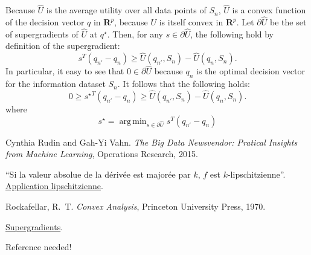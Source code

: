 \documentclass[11pt,fleqn]{article}
\DeclareMathOperator*{\argmin}{arg\,min}
\newcommand{\dd}{\partial}
\newcommand{\real}{\bm R}
\theoremstyle{plain}
\theoremstyle{definition}
\begin{document}
Because $\hat U$ is the average utility over all data points of $S_n$, $\hat U$ is a
convex function of the decision vector $q$ in $\real^p$, because $U$ is itself convex in
$\real^p$. Let $\dd\hat U$ be the set of supergradients of $\hat U$ at $q^\star$. Then,
for any $s\in\dd\hat U$, the following hold by definition of the supergradient:
\begin{equation}
s^T(q_{n'}-q_n) \geq \hat U(q_{n'},S_n) - \hat U(q_n,S_n).
\end{equation}
In particular, it easy to see that $0\in\dd\hat U$ because $q_n$ is the optimal decision
vector for the information dataset $S_n$. It follows that the following holds:
\begin{equation}
  0 \geq {s^\star}^T(q_{n'} - q_n) \geq  \hat U(q_{n'},S_n) - \hat U(q_n,S_n).
\end{equation}
where
\begin{equation}
  s^\star = \argmin_{s\in\dd\hat U} s^T(q_{n'} - q_n)
\end{equation}


\begin{thebibliography}{99}

  Cynthia Rudin and Gah-Yi Vahn. \textit{The Big Data Newsvendor: Pratical Insights from
    Machine Learning}, Operations Research, 2015.

  ``Si la valeur absolue de la dérivée est majorée par $k$, $f$ est $k$-lipschitzienne''.
  \href{https://fr.wikipedia.org/wiki/Application_lipschitzienne}{Application
    lipschitzienne}.

  Rockafellar, R.~T. \emph{Convex Analysis}, Princeton University Press, 1970.

  \href{http://people.hss.caltech.edu/~kcb/Notes/Supergrad.pdf}{Supergradients}.

 Reference needed!

\end{thebibliography}
\end{document}
